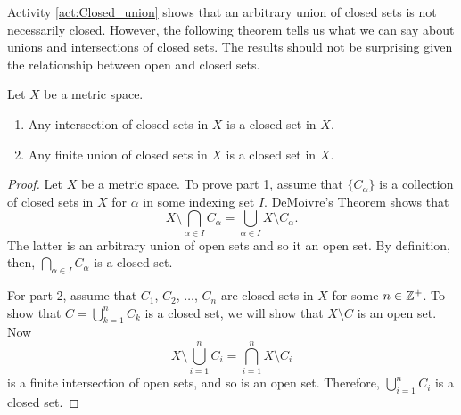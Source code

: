 \begin{comment}

\ActivitySolution

\ba
\item As we let $n$ go to infinity, $1-\frac{1}{n}$ will approach $1$ but not reach $1$, and $\frac{1}{n}$ will approach $0$ but not reach $0$. So $\bigcup_{n \geq 1} A_n = (0,1)$.
		
\item The complement of $\bigcup_{n \geq 1} A_n$ in $\R$ is $(-\infty,0] \cup [1,\infty)$, and $0$ is not an interior point. So $(-\infty,0] \cup [1,\infty)$ is not open and $\bigcup_{n \geq 1} A_n$ is not closed in $\R$.

\ea

\end{comment}

Activity \ref{act:Closed_union} shows that an arbitrary union of closed sets is not necessarily closed. However, the following theorem tells us what we can say about unions and intersections of closed sets. The results should not be surprising given the relationship between open and closed sets.

\begin{theorem} Let $X$ be a metric space.
\begin{enumerate}
\item Any intersection of closed sets in $X$ is a closed set in $X$.
\item Any finite union of closed sets in $X$ is a closed set in $X$. 
\end{enumerate}
\end{theorem}

\begin{proof} Let $X$ be a metric space. To prove part 1, assume that $\{C_{\alpha}\}$ is a collection of closed sets in $X$ for $\alpha$ in some indexing set $I$. DeMoivre's Theorem shows that 
\[X \setminus \bigcap_{\alpha \in I} C_{\alpha} = \bigcup_{\alpha \in I} X \setminus C_{\alpha}.\]
The latter is an arbitrary union of open sets and so it an open set. By definition, then, $\bigcap_{\alpha \in I} C_{\alpha}$ is a closed set. 

For part 2, assume that $C_1$, $C_2$, $\ldots$, $C_n$ are closed sets in $X$ for some $n \in \mathbb{Z}^+$. To show that $C = \bigcup_{k=1}^n C_k$ is a closed set, we will show that $X \setminus C$ is an open set. Now 
\[X \setminus \bigcup_{i=1}^n C_{i} = \bigcap_{i=1}^n X \setminus C_{i}\]
is a finite intersection of open sets, and so is an open set. Therefore, $\bigcup_{i=1}^n C_{i} $ is a closed set. 
\end{proof}


